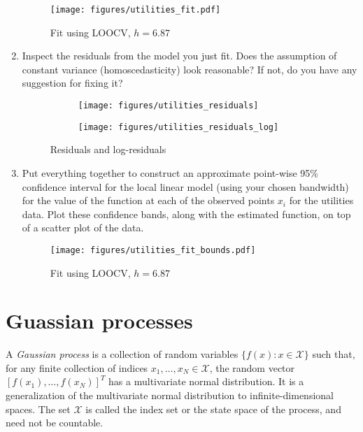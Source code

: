 \documentclass[10pt]{article}
\begin{document}
\begin{enumerate}[label=(\Alph*)]
        \begin{figure}[ht] 
          \centering 
          \texttt{[image: figures/utilities\_fit.pdf]}
          \caption{\label{fig:utilities_fit} Fit using LOOCV, $h=6.87$}
        \end{figure}

        \item Inspect the residuals from the model you just fit.  Does the assumption of constant variance (homoscedasticity) look reasonable?  If not, do you have any suggestion for fixing it?

        \begin{figure}
            \begin{subfigure}{.5\textwidth}
              \centering
              \texttt{[image: figures/utilities\_residuals]}
            \end{subfigure}%
            \begin{subfigure}{.5\textwidth}
              \centering
              \texttt{[image: figures/utilities\_residuals\_log]}
            \end{subfigure}
        \caption{Residuals and log-residuals}
        \label{fig:standard_error}
        \end{figure}

        \item Put everything together to construct an approximate point-wise 95\% confidence interval for the local linear model (using your chosen bandwidth) for the value of the function at each of the observed points $x_i$ for the utilities data. Plot these confidence bands, along with the estimated function, on top of a scatter plot of the data.

        \begin{figure}[ht] 
          \centering 
          \texttt{[image: figures/utilities\_fit\_bounds.pdf]}
          \caption{\label{fig:utilities_fit_bounds} Fit using LOOCV, $h=6.87$}
        \end{figure}

    \end{enumerate}

    \clearpage

    \section*{Guassian processes}

    A \textit{Gaussian process} is a collection of random variables $\{f(x): x \in \mathcal{X}\}$ such that, for any finite collection of indices $x_1, \ldots, x_N \in \mathcal{X}$, the random vector $[f(x_1), \ldots, f(x_N)]^T$ has a multivariate normal distribution.  It is a generalization of the multivariate normal distribution to infinite-dimensional spaces. The set $\mathcal{X}$ is called the index set or the state space of the process, and need not be countable.
\end{document}

